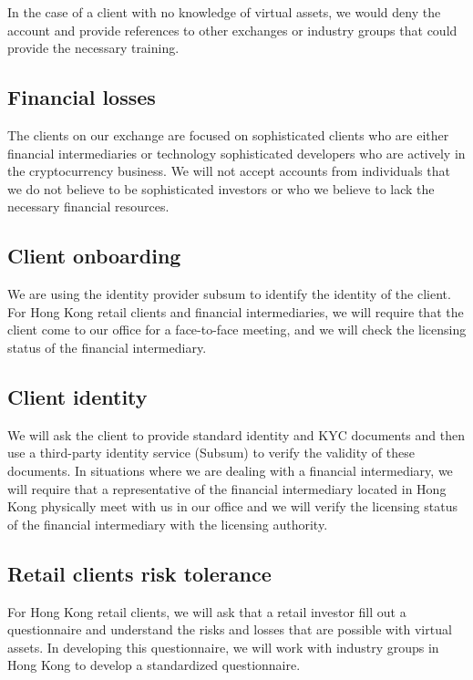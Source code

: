 In the case of a client with no knowledge of virtual assets, we would deny
the account and provide references to other exchanges or industry
groups that could provide the necessary training.

\subsection{Financial losses}

The clients on our exchange are focused on sophisticated clients who
are either financial intermediaries or technology sophisticated
developers who are actively in the cryptocurrency business.  We will
not accept accounts from individuals that we do not believe to be
sophisticated investors or who we believe to lack the necessary financial
resources.

\subsection{Client onboarding}

We are using the identity provider subsum to identify the identity of
the client.  For Hong Kong retail clients and financial
intermediaries, we will require that the client come to our office for
a face-to-face meeting, and we will check the licensing status of the
financial intermediary.

\subsection{Client identity}
We will ask the client to provide standard identity and KYC documents
and then use a third-party identity service (Subsum) to verify the
validity of these documents.  In situations where we are dealing with
a financial intermediary, we will require that a representative of the
financial intermediary located in Hong Kong physically meet with us in
our office and we will verify the licensing status of the financial
intermediary with the licensing authority.

\subsection{Retail clients risk tolerance}

For Hong Kong retail clients, we will ask that a retail investor fill
out a questionnaire and understand the risks and losses that are
possible with virtual assets.  In developing this questionnaire, we will
work with industry groups in Hong Kong to develop a standardized
questionnaire.


